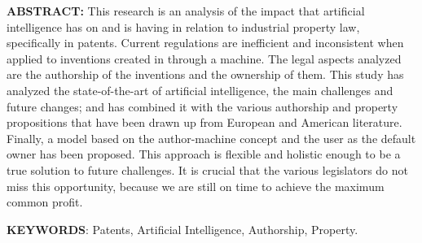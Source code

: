 \documentclass[12pt]{article}
\begin{document}
\vspace{\baselineskip}
\par


\vspace{\baselineskip}

\vspace{\baselineskip}

\vspace{\baselineskip}

\vspace{\baselineskip}
\begin{justify}
\textbf{ABSTRACT:} This research is an analysis of the impact that artificial intelligence has on and is having in relation to industrial property law, specifically in patents. Current regulations are inefficient and inconsistent when applied to inventions created in through a machine. The legal aspects analyzed are the authorship of the inventions and the ownership of them. This study has analyzed the state-of-the-art of artificial intelligence, the main challenges and future changes; and has combined it with the various authorship and property propositions that have been drawn up from European and American literature. Finally, a model based on the author-machine concept and the user as the default owner has been proposed. This approach is flexible and holistic enough to be a true solution to future challenges. It is crucial that the various legislators do not miss this opportunity, because we are still on time to achieve the maximum common profit. 
\end{justify}\par


\vspace{\baselineskip}

\vspace{\baselineskip}
\begin{justify}
{\fontsize{10pt}{12.0pt}\selectfont \textbf{KEYWORDS}: Patents, Artificial Intelligence, Authorship, Property. \par}
\end{justify}\par


\vspace{\baselineskip}
\end{document}
